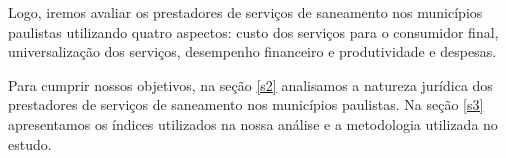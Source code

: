 \begin{multicols}{2}
Logo, iremos avaliar os prestadores de serviços de saneamento nos municípios paulistas utilizando quatro aspectos: custo dos serviços para o consumidor final, universalização dos serviços, desempenho financeiro e produtividade e despesas.

Para cumprir nossos objetivos, na seção \ref{s2} analisamos a natureza jurídica dos prestadores de serviços de saneamento nos municípios paulistas. Na seção \ref{s3} apresentamos os índices utilizados na nossa análise e a metodologia utilizada no estudo.



\end{multicols}





  